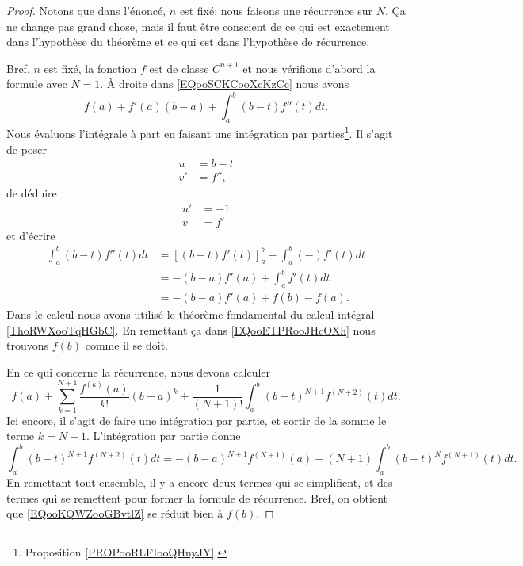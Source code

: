 \begin{proof}
	Notons que dans l'énoncé, \( n\) est fixé; nous faisons une récurrence sur \( N\). Ça ne change pas grand chose, mais il faut être conscient de ce qui est exactement dans l'hypothèse du théorème et ce qui est dans l'hypothèse de récurrence.

	Bref, \( n\) est fixé, la fonction \( f\) est de classe \( C^{n+1}\) et nous vérifions d'abord la formule avec \( N=1\). À droite dans \eqref{EQooSCKCooXcKzCc} nous avons
	\begin{equation}        \label{EQooETPRooJHcOXh}
		f(a)+f'(a)(b-a)+\int_a^b(b-t)f''(t)dt.
	\end{equation}
	Nous évaluons l'intégrale à part en faisant une intégration par parties\footnote{Proposition \ref{PROPooRLFIooQHnyJY}.}. Il s'agit de poser
	\begin{subequations}
		\begin{align}
			u  & =b-t  \\
			v' & =f'',
		\end{align}
	\end{subequations}
	de déduire
	\begin{subequations}
		\begin{align}
			u' & =-1 \\
			v  & =f'
		\end{align}
	\end{subequations}
	et d'écrire
	\begin{subequations}
		\begin{align}
			\int_a^b(b-t)f''(t)dt & =\left[ (b-t)f'(t) \right]^b_a-\int_a^b(-)f'(t)dt \\
			                      & =-(b-a)f'(a)+\int_a^bf'(t)dt                      \\
			                      & =-(b-a)f'(a)+f(b)-f(a).
		\end{align}
	\end{subequations}
	Dans le calcul nous avons utilisé le théorème fondamental du calcul intégral \ref{ThoRWXooTqHGbC}. En remettant ça dans \eqref{EQooETPRooJHcOXh} nous trouvons \( f(b)\) comme il se doit.

	En ce qui concerne la récurrence, nous devons calculer
	\begin{equation}        \label{EQooKQWZooGBvtlZ}
		f(a)+\sum_{k=1}^{N+1}\frac{ f^{(k)}(a) }{ k! }(b-a)^k+\frac{1}{ (N+1)! }\int_a^b(b-t)^{N+1}f^{(N+2)}(t)dt.
	\end{equation}
	Ici encore, il s'agit de faire une intégration par partie, et sortir de la somme le terme \( k=N+1\). L'intégration par partie donne
	\begin{equation}
		\int_a^b(b-t)^{N+1}f^{(N+2)}(t)dt=-(b-a)^{N+1}f^{(N+1)}(a)+(N+1)\int_a^b(b-t)^Nf^{(N+1)}(t)dt.
	\end{equation}
	En remettant tout ensemble, il y a encore deux termes qui se simplifient, et des termes qui se remettent pour former la formule de récurrence. Bref, on obtient que \eqref{EQooKQWZooGBvtlZ} se réduit bien à \( f(b)\).
\end{proof}

